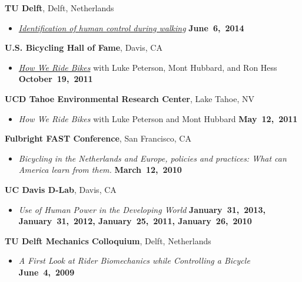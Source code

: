\documentclass[10pt]{article}
\newenvironment{outerlist}[1][\enskip\textbullet]%
        {\begin{itemize}[#1]}{\end{itemize}%
         \vspace{-.6\baselineskip}}
\newcommand{\blankline}{\quad\pagebreak[2]}
\begin{document}
\blankline

\textbf{TU Delft}, Delft, Netherlands
\begin{outerlist}
\item[]
  \href{http://www.moorepants.info/presentations/2014/tu-delft-robotics-talk-2014}{\textit{Identification
  of human control during walking}}
    \hfill \textbf{June~6,~2014}
\end{outerlist}

\blankline

\textbf{U.S. Bicycling Hall of Fame}, Davis, CA
\begin{outerlist}
\item[] \textit{\href{http://mae.ucdavis.edu/~biosport/bhoftalk/}{How We Ride
  Bikes}} with Luke Peterson, Mont Hubbard, and Ron Hess
    \hfill \textbf{October~19,~2011}
\end{outerlist}

\blankline

\textbf{UCD Tahoe Environmental Research Center}, Lake Tahoe, NV
\begin{outerlist}
  \item[] \textit{How We Ride Bikes} with Luke Peterson and Mont Hubbard \hfill
    \textbf{May~12,~2011}
\end{outerlist}

\blankline

\textbf{Fulbright FAST Conference}, San Francisco, CA
\begin{outerlist}
  \item[] \textit{Bicycling in the Netherlands and Europe, policies and
    practices: What can America learn from them.}
    \hfill \textbf{March~12,~2010}
\end{outerlist}

\blankline

\textbf{UC Davis D-Lab}, Davis, CA
\begin{outerlist}
  \item[] \textit{Use of Human Power in the Developing World}
    \hfill \textbf{January~31,~2013, January~31,~2012, January~25,~2011, January~26,~2010}
\end{outerlist}

\blankline

\textbf{TU Delft Mechanics Colloquium}, Delft, Netherlands
\begin{outerlist}
  \item[] \textit{A First Look at Rider Biomechanics while Controlling a Bicycle}
    \hfill \textbf{June~4,~2009}
\end{outerlist}
\end{document}

